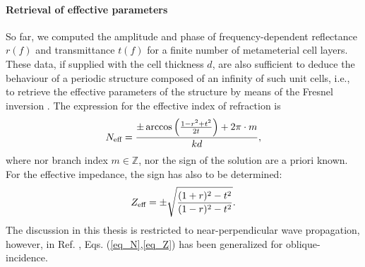 \paragraph{Retrieval of effective parameters} %
So far, we computed the amplitude and phase of frequency-dependent reflectance $r(f)$ and transmittance $t(f)$ for a finite number of metameterial cell layers. 
These data, if supplied with the cell thickness $d$, are also sufficient to deduce the behaviour of a periodic structure composed of an infinity of such unit cells, i.e., to retrieve the effective parameters of the structure by means of the Fresnel inversion \cite{smith2002determination} \cite[pp. 51-55]{shalaev2010book}. The expression for the effective index of refraction is
\begin{equation} N_{\text{eff} } = \frac{\pm \arccos\left(\frac{1 - r^2+t^2}{2 t}\right) + 2\pi \cdot m}{k d}, \label{eq_N} \end{equation}
where nor branch index $m\in \mathbb{Z}$, nor the sign of the solution are a priori known. For the effective impedance, the sign has also to be determined: 
\begin{equation} Z_{\text{eff} } = \pm \sqrt{\frac{(1+r)^2 - t^2}{(1-r)^2 - t^2}}. \label{eq_Z} \end{equation}
	The discussion in this thesis is restricted to near-perpendicular wave propagation, however, in Ref. \cite{menzel2008retrieving}, Eqs. (\ref{eq_N},\ref{eq_Z}) has been generalized for oblique-incidence.


